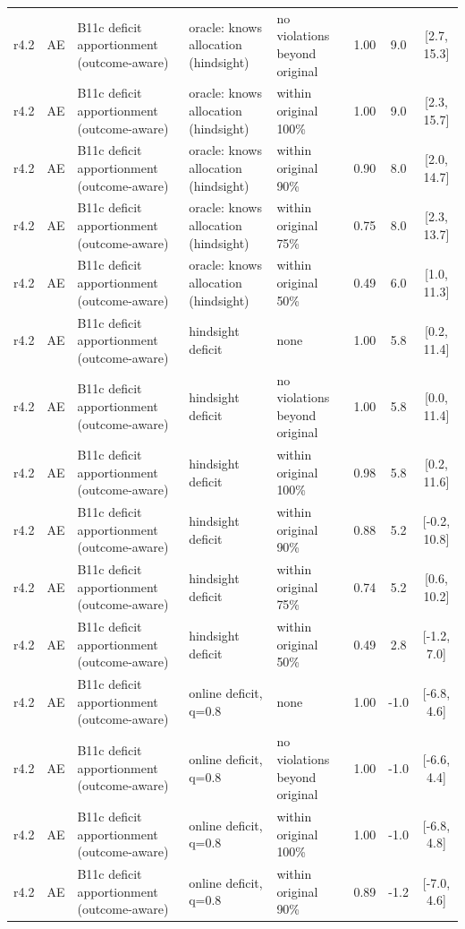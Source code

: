 \documentclass[10pt,onecolumn,letterpaper]{article}
\begin{document}
\begin{longtable}{lllp{4.2cm}p{3.4cm}ccc}
r4.2 & AE & B11c deficit apportionment (outcome-aware) & oracle: knows allocation (hindsight) & no violations beyond original & 1.00 & 9.0 & [2.7, 15.3] \\
r4.2 & AE & B11c deficit apportionment (outcome-aware) & oracle: knows allocation (hindsight) & within original 100\% & 1.00 & 9.0 & [2.3, 15.7] \\
r4.2 & AE & B11c deficit apportionment (outcome-aware) & oracle: knows allocation (hindsight) & within original 90\% & 0.90 & 8.0 & [2.0, 14.7] \\
r4.2 & AE & B11c deficit apportionment (outcome-aware) & oracle: knows allocation (hindsight) & within original 75\% & 0.75 & 8.0 & [2.3, 13.7] \\
r4.2 & AE & B11c deficit apportionment (outcome-aware) & oracle: knows allocation (hindsight) & within original 50\% & 0.49 & 6.0 & [1.0, 11.3] \\
r4.2 & AE & B11c deficit apportionment (outcome-aware) & hindsight deficit & none & 1.00 & 5.8 & [0.2, 11.4] \\
r4.2 & AE & B11c deficit apportionment (outcome-aware) & hindsight deficit & no violations beyond original & 1.00 & 5.8 & [0.0, 11.4] \\
r4.2 & AE & B11c deficit apportionment (outcome-aware) & hindsight deficit & within original 100\% & 0.98 & 5.8 & [0.2, 11.6] \\
r4.2 & AE & B11c deficit apportionment (outcome-aware) & hindsight deficit & within original 90\% & 0.88 & 5.2 & [-0.2, 10.8] \\
r4.2 & AE & B11c deficit apportionment (outcome-aware) & hindsight deficit & within original 75\% & 0.74 & 5.2 & [0.6, 10.2] \\
r4.2 & AE & B11c deficit apportionment (outcome-aware) & hindsight deficit & within original 50\% & 0.49 & 2.8 & [-1.2, 7.0] \\
r4.2 & AE & B11c deficit apportionment (outcome-aware) & online deficit, q=0.8 & none & 1.00 & -1.0 & [-6.8, 4.6] \\
r4.2 & AE & B11c deficit apportionment (outcome-aware) & online deficit, q=0.8 & no violations beyond original & 1.00 & -1.0 & [-6.6, 4.4] \\
r4.2 & AE & B11c deficit apportionment (outcome-aware) & online deficit, q=0.8 & within original 100\% & 1.00 & -1.0 & [-6.8, 4.8] \\
r4.2 & AE & B11c deficit apportionment (outcome-aware) & online deficit, q=0.8 & within original 90\% & 0.89 & -1.2 & [-7.0, 4.6] \\

\end{longtable}
\end{document}
